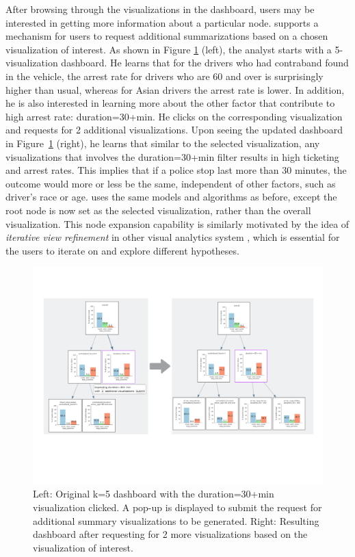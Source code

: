 \par After browsing through the visualizations in the dashboard, users may be interested in getting more information about a particular node. \system supports a mechanism for users to request additional summarizations based on a chosen visualization of interest. As shown in Figure \ref{fig:altroot_expansion} (left), the analyst starts with a 5-visualization dashboard. He learns that for the drivers who had contraband found in the vehicle, the arrest rate for drivers who are 60 and over is surprisingly higher than usual, whereas for Asian drivers the arrest rate is lower. In addition, he is also interested in learning more about the other factor that contribute to high arrest rate: duration=30+min. He clicks on the corresponding visualization and requests for 2 additional visualizations. Upon seeing the updated dashboard in Figure~\ref{fig:altroot_expansion} (right), he learns that similar to the selected visualization, any visualizations that involves the duration=30+min filter results in high ticketing and arrest rates. This implies that if a police stop last more than 30 minutes, the outcome would more or less be the same, independent of other factors, such as driver's race or age. \system uses the same models and algorithms as before, except the root node is now set as the selected visualization, rather than the overall visualization. This node expansion capability is similarly motivated by the idea of \textit{iterative view refinement} in other visual analytics system \cite{Wongsuphasawat2016,Hoque2017}, which is essential for the users to iterate on and explore different hypotheses.

\begin{figure}[ht!]
\centering
\includegraphics[width=\linewidth]{figures/expansion_example.pdf}
\caption{Left: Original k=5 dashboard with the duration=30+min visualization clicked. A pop-up is displayed to submit the request for additional summary visualizations to be generated. Right: Resulting dashboard after requesting for 2 more visualizations based on the visualization of interest.}
\label{fig:altroot_expansion}
\end{figure}

